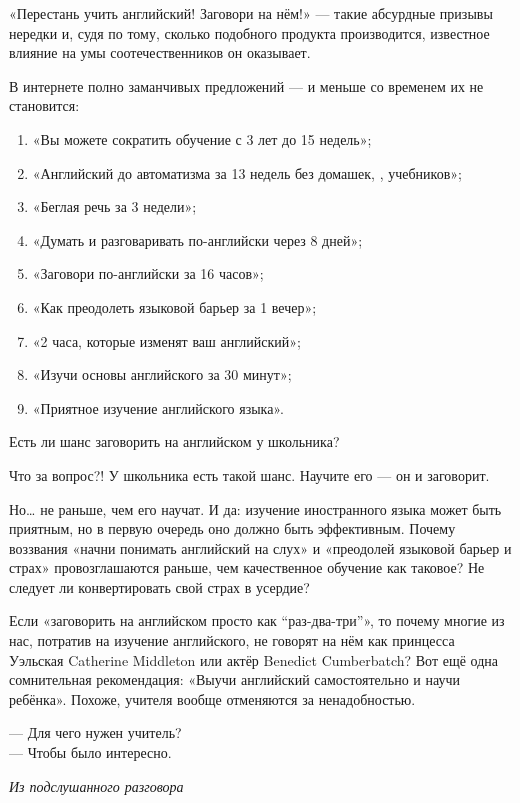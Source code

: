 «Перестань учить английский! Заговори на нём!» — такие абсурдные призывы нередки и, судя по тому, сколько подобного продукта производится, известное влияние на умы соотечественников он оказывает.

В интернете полно заманчивых предложений — и меньше со временем их не становится:

\begin{enumerate}
    \item «Вы можете сократить обучение с 3 лет до 15 недель»;
    \item «Английский до автоматизма за 13 недель без домашек, , учебников»;
    \item «Беглая речь за 3 недели»;
    \item «Думать и разговаривать по-английски через 8 дней»;
    \item «Заговори по-английски за 16 часов»;
    \item «Как преодолеть языковой барьер за 1 вечер»;
    \item «2 часа, которые изменят ваш английский»;
    \item «Изучи основы английского за 30 минут»;
    \item «Приятное изучение английского языка».
\end{enumerate}

Есть ли шанс заговорить на английском у школьника?

Что за вопрос?! У школьника есть такой шанс. Научите его — он и заговорит.

Но… не раньше, чем его научат. И да: изучение иностранного языка может быть приятным, но в первую очередь оно должно быть эффективным. Почему воззвания «начни понимать английский на слух» и «преодолей языковой барьер и страх» провозглашаются раньше, чем качественное обучение как таковое? Не следует ли конвертировать свой страх в усердие?

Если «заговорить на английском просто как ``раз-два-три''», то почему многие из нас, потратив  на изучение английского, не говорят на нём как принцесса Уэльская Catherine Middleton или актёр Benedict Cumberbatch? Вот ещё одна сомнительная рекомендация: «Выучи английский самостоятельно и научи ребёнка». Похоже, учителя вообще отменяются за ненадобностью.

\begin{fancyquotes}
    — Для чего нужен учитель?\\
    — Чтобы было интересно.\\

    \begin{flushright}
        \it Из подслушанного разговора
    \end{flushright}
\end{fancyquotes}

